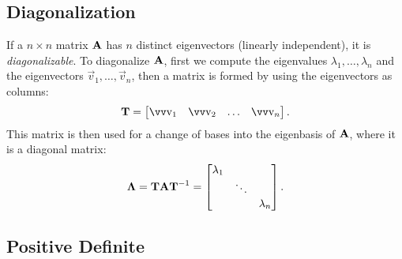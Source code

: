 \subsection{Diagonalization}

If a \(n \times n\) matrix \(\bm{\mathrm{A}}\) has \(n\) distinct eigenvectors (linearly independent), it is \emph{diagonalizable}. To diagonalize \(\bm{\mathrm{A}}\), first we compute the eigenvalues \(\lambda_1, \ldots, \lambda_n\) and the eigenvectors \(\vec{v}_1, \ldots, \vec{v}_n\), then a matrix is formed by using the eigenvectors as columns:
\[
	\mx{T} = \begin{bmatrix}
		\vec{v}_1 & \vec{v}_2 & \dots & \vec{v}_n
	\end{bmatrix}.
\]
This matrix is then used for a change of bases into the eigenbasis of \(\bm{\mathrm{A}}\), where it is a diagonal matrix:
\[
	\bm{\mathrm{\Lambda}} = \bm{\mathrm{T}} \bm{\mathrm{A}} \bm{\mathrm{T}}^{-1} = \begin{bmatrix}
		\lambda_1 \\
		& \ddots \\
		& & \lambda_n
	\end{bmatrix}.
\]

\subsection{Positive Definite}

